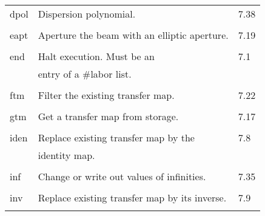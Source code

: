 \begin{center}
\begin{tabular}{lll}
\hspace{1.5em}dpol  &         Dispersion polynomial.        & \hspace{2em}7.38\\
\vspace{-3mm}& &\\
\hspace{1.5em}eapt  & Aperture the beam with an elliptic aperture. & \hspace{2em}7.19\\
\vspace{-3mm}& &\\
\hspace{1.5em}end   &        Halt execution.  Must be an         & \hspace{2em}7.1\\
                    & entry of a \#labor list.                  &\\
\vspace{-3mm}& &\\
\hspace{1.5em}ftm   &        Filter the existing transfer map.     & \hspace{2em}7.22\\
\vspace{-3mm}& &\\
\hspace{1.5em}gtm   &        Get a transfer map from storage.      & \hspace{2em}7.17\\
\vspace{-3mm}& &\\
\hspace{1.5em}iden  &         Replace existing transfer map by the & \hspace{2em}7.8\\
                    & identity map.                                &\\
\vspace{-3mm}& &\\
\hspace{1.5em}inf  &   Change or write out values of infinities.   & \hspace{2em}7.35\\
\vspace{-3mm}& &\\
\hspace{1.5em}inv   & Replace existing transfer map by its inverse. & \hspace{2em}7.9\\
\vspace{-3mm}& &\\

\end{tabular}
\end{center}
